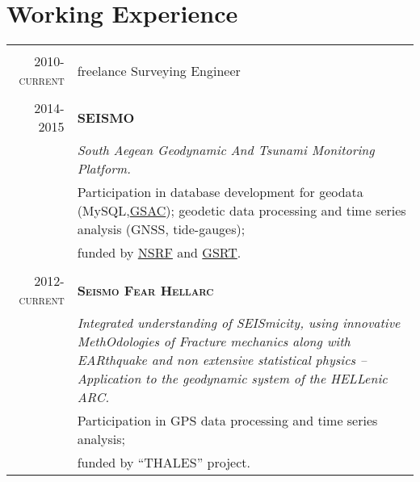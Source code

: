 \documentclass[a4paper,10pt]{article} %
\begin{document}

\section{Working Experience}

\begin{longtable}{r|p{13cm}}


\multicolumn{2}{c}{} \\
\textsc{2010-current} & freelance Surveying Engineer\\ 

\multicolumn{2}{c}{} \\
\textsc{2014-2015} & \textbf{\textsc{SEISMO}}\\
  & \textit{South Aegean Geodynamic And Tsunami Monitoring Platform.}\\
  & Participation in database development for geodata (MySQL,\href{http://www.unavco.org/software/data-management/gsac/gsac.html}{GSAC});
    geodetic data processing and time series analysis (GNSS, tide-gauges); \\
  & funded by \href{http://www.espa.gr/en/Pages/Default.aspx}{NSRF} and \href{http://www.gsrt.gr/central.aspx?sId=119I428I1089I323I488743}{GSRT}.\\

\multicolumn{2}{c}{} \\
\textsc{2012-current} & \textbf{\textsc{Seismo Fear Hellarc}}\\
  & \textit{Integrated understanding of SEISmicity, using innovative MethOdologies of Fracture mechanics along with EARthquake and non extensive statistical physics – Application to the geodynamic system of the HELLenic ARC.}\\
  & Participation in GPS data processing and time series analysis;\\
  & funded by \textquotedblleft THALES\textquotedblright{} project.\\


\end{longtable}
\end{document}
